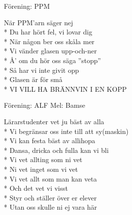 \begin{SongText}
    \begin{SongInfo}
        Förening: PPM
    \end{SongInfo}
    \begin{SongVerse}
        När PPM’arn säger nej\\*%
        Du har hört fel, vi lovar dig\\*%
        När någon ber oss skåla mer\\*%
        Vi vänder glasen upp-och-ner\\*%
        Å’ om du hör oss säga ”stopp”\\*%
        Så har vi inte givit opp\\*%
        Glasen är för små\\*%
        VI VILL HA BRÄNNVIN I EN KOPP
    \end{SongVerse}
\end{SongText}

\begin{SongText}
    \begin{SongInfo}
        Förening: ALF
        Mel: Bamse
    \end{SongInfo}
    \begin{SongVerse}
        Lärarstudenter vet ju bäst av alla\\*%
        Vi begränsar oss inte till att sy(maskin)\\*%
        Vi kan festa bäst av allihopa\\*%
        Dansa, dricka och fulla kan vi bli\\*%
        Vi vet allting som ni vet\\*%
        Ni vet inget som vi vet\\*%
        Vi vet allt som man kan veta\\*%
        Och det vet vi visst\\*%
        Styr och ställer över er elever\\*%
        Utan oss skulle ni ej vara här
    \end{SongVerse}
\end{SongText}

